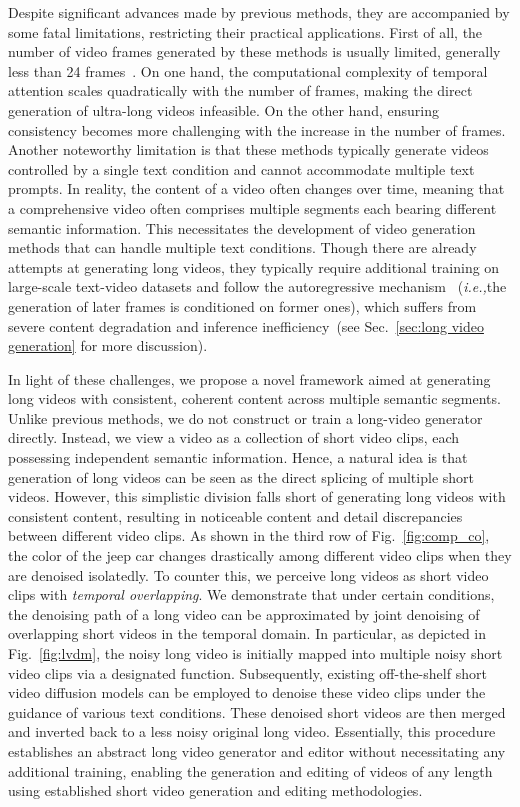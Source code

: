 \documentclass{article}
\def\ie{\emph{i.e.,}}
\begin{document}
Despite significant advances made by previous methods, they are accompanied by some fatal limitations, restricting their practical applications. First of all, the number of video frames generated by these methods is usually limited, generally less than 24 frames~\cite{qi2023fatezero,wu2022tune,liu2023video,khachatryan2023text2video,luo2023videofusion}. On one hand, the computational complexity of temporal attention scales quadratically with the number of frames, making the direct generation of ultra-long videos infeasible. On the other hand, ensuring consistency becomes more challenging with the increase in the number of frames. Another noteworthy limitation is that these methods typically generate videos controlled by a single text condition and cannot accommodate multiple text prompts. In reality, the content of a video often changes over time, meaning that a comprehensive video often comprises multiple segments each bearing different semantic information. This necessitates the development of video generation methods that can handle multiple text conditions. Though there are already attempts at generating long videos, they typically require additional training on large-scale text-video datasets and follow the autoregressive mechanism ~(\ie the generation of later frames is conditioned on former ones), which suffers from severe content degradation and inference inefficiency~(see Sec.~\ref{sec:long video generation} for more discussion).

In light of these challenges, we propose a novel framework aimed at generating long videos with consistent, coherent content across multiple semantic segments. Unlike previous methods, we do not construct or train a long-video generator directly. Instead, we view a video as a collection of short video clips, each possessing independent semantic information. Hence, a natural idea is that generation of long videos can be seen as the direct splicing of multiple short videos. However, this simplistic division falls short of generating long videos with consistent content, resulting in noticeable content and detail discrepancies between different video clips. As shown in the third row of Fig.~\ref{fig:comp_co}, the color of the jeep car changes drastically among different video clips when they are denoised isolatedly. To counter this, we perceive long videos as short video clips with \textit{temporal overlapping}. We demonstrate that under certain conditions, the denoising path of a long video can be approximated by joint denoising of overlapping short videos in the temporal domain. In particular, as depicted in Fig.~\ref{fig:lvdm}, the noisy long video is initially mapped into multiple noisy short video clips via a designated function. Subsequently, existing off-the-shelf short video diffusion models can be employed to denoise these video clips under the guidance of various text conditions. These denoised short videos are then merged and inverted back to a less noisy original long video. Essentially, this procedure establishes an abstract long video generator and editor without necessitating any additional training, enabling the generation and editing of videos of any length using established short video generation and editing methodologies.
\end{document}
